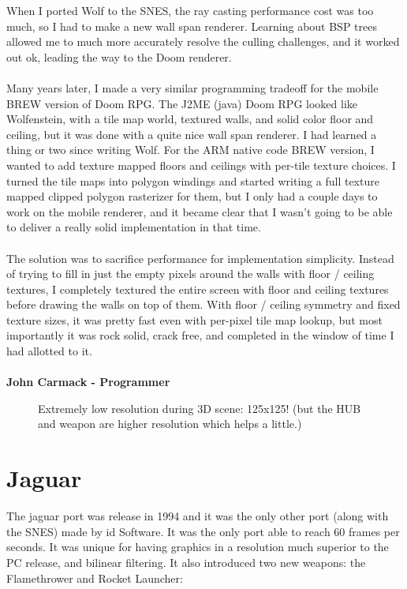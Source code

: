 \documentclass[book.tex]{subfiles}
\begin{document}
\begin{fancyquotes}
    When I ported Wolf to the SNES, the ray casting performance cost was too much, so I had to make a new wall span renderer.  Learning about BSP trees allowed me  to much more accurately resolve the culling challenges, and it worked out ok, leading the way to the Doom renderer.\\
\\
Many years later, I made a very similar programming tradeoff for the mobile BREW version of Doom RPG.  The J2ME (java) Doom RPG looked like Wolfenstein, with a tile map world, textured walls, and solid color floor and ceiling, but it was done with a quite nice wall span renderer.  I had learned a thing or two since writing Wolf.  For the ARM native code BREW version, I wanted to add texture mapped floors and ceilings with per-tile texture choices.  I turned the tile maps into polygon windings and started writing a full texture mapped clipped polygon rasterizer for them, but I only had a couple days to work on the mobile renderer, and it became clear that I wasn't going to be able to deliver a really solid implementation in that time.\\
 \\
The solution was to sacrifice performance for implementation simplicity.  Instead of trying to fill in just the empty pixels around the walls with floor / ceiling textures, I completely textured the entire screen with floor and ceiling textures before drawing the walls on top of them.  With floor / ceiling symmetry and fixed texture sizes, it was pretty fast even with per-pixel tile map lookup, but most importantly it was rock solid, crack free, and completed in the window of time I had allotted to it.\\
\\
\textbf{John Carmack - Programmer}
\end{fancyquotes}


\par
\begin{figure}[H]
\centering
 \caption{Extremely low resolution during 3D scene: 125x125! (but the HUB and weapon are higher resolution which helps a little.)}
 \end{figure}
 \par










\section{Jaguar}
The jaguar port was release in 1994 and it was the only other port (along with the SNES) made by id Software. It was the only port able to reach 60 frames per seconds. It was unique for having graphics in a resolution much superior to the PC release, and bilinear filtering. It also introduced two new weapons: the Flamethrower and Rocket Launcher:\\
\par
\end{document}
